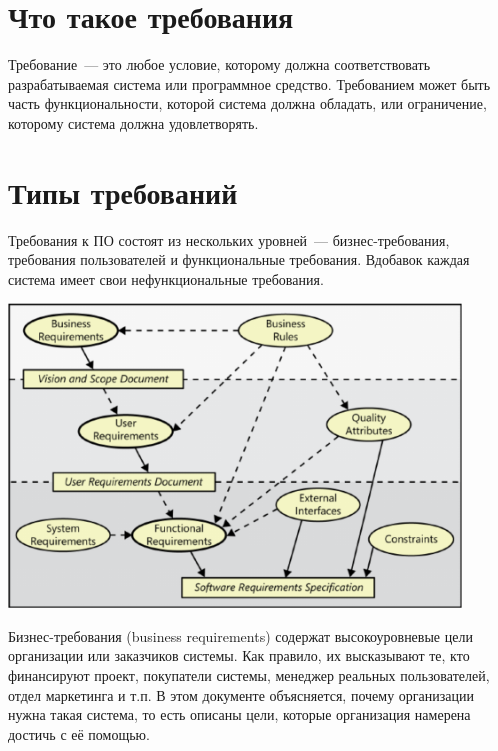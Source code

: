 \documentclass{../../text-style}
\begin{document}
\maketitle
\thispagestyle{empty}


\section{Что такое требования}

Требование~--- это любое условие, которому должна соответствовать разрабатываемая система или программное средство. Требованием может быть часть функциональности, которой система должна обладать, или ограничение, которому система должна удовлетворять.

\section{Типы требований}

Требования к ПО состоят из нескольких уровней~--- бизнес-требования, требования пользователей и функциональные требования. Вдобавок каждая система имеет свои нефункциональные требования.

\begin{center}
    \includegraphics[width=0.9\textwidth]{requirements.png}
\end{center}


Бизнес-требования (business requirements) содержат высокоуровневые цели организации или заказчиков системы. Как правило, их высказывают те, кто финансируют проект, покупатели системы, менеджер реальных пользователей, отдел маркетинга и т.п. В этом документе объясняется, почему организации нужна такая система, то есть описаны цели, которые организация намерена достичь с её помощью.
\end{document}
